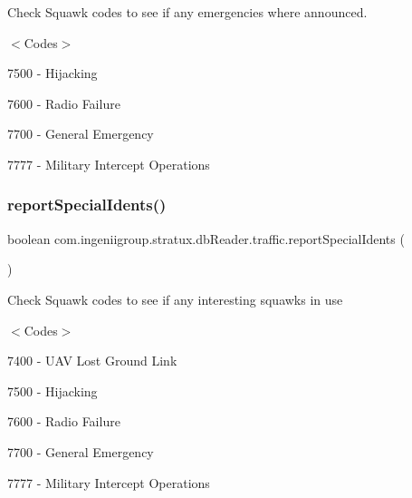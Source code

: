 Check Squawk codes to see if any emergencies where announced.

$<$\+Codes$>$
\begin{DoxyItemize}
\item 7500 -\/ Hijacking
\item 7600 -\/ Radio Failure
\item 7700 -\/ General Emergency
\item 7777 -\/ Military Intercept Operations 
\end{DoxyItemize}\mbox{\label{classcom_1_1ingeniigroup_1_1stratux_1_1db_reader_1_1traffic_a6603e1971f8d06595c1183b5fde80e70}} 
\subsubsection{\texorpdfstring{report\+Special\+Idents()}{reportSpecialIdents()}}
{\footnotesize\ttfamily boolean com.\+ingeniigroup.\+stratux.\+db\+Reader.\+traffic.\+report\+Special\+Idents (\begin{DoxyParamCaption}{ }\end{DoxyParamCaption})}

Check Squawk codes to see if any interesting squawks in use

$<$\+Codes$>$
\begin{DoxyItemize}
\item 7400 -\/ U\+AV Lost Ground Link
\item 7500 -\/ Hijacking
\item 7600 -\/ Radio Failure
\item 7700 -\/ General Emergency
\item 7777 -\/ Military Intercept Operations 
\end{DoxyItemize}\mbox{\label{classcom_1_1ingeniigroup_1_1stratux_1_1db_reader_1_1traffic_a0f3716cdec2ed740193c1eb6a9b27c7f}} 
